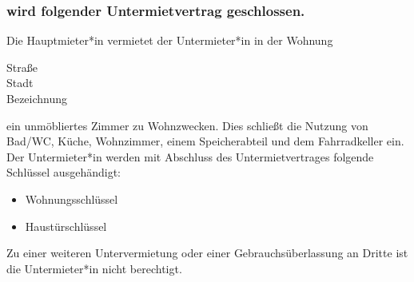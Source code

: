 

\subsubsection*{wird folgender Untermietvertrag geschlossen.}

Die Hauptmieter*in vermietet der Untermieter*in in der Wohnung

\vspace{2ex}
\begin{addmargin}[.25\textwidth]{.25\textwidth}
  Straße \MYdotfill \textbf{\WOHNUNGstreet~\WOHNUNGstreetnumber} \\
  Stadt \MYdotfill \textbf{\WOHNUNGzipcode~\WOHNUNGcity} \\
  Bezeichnung \MYdotfill \textbf{\WOHNUNGinfoA~\WOHNUNGinfoB}
\end{addmargin}
\vspace{2ex}

ein unmöbliertes Zimmer zu Wohnzwecken. Dies schließt die Nutzung von
Bad/WC, Küche, Wohnzimmer, einem Speicherabteil und dem Fahrradkeller
ein. Der Untermieter*in werden mit Abschluss des Untermietvertrages
folgende Schlüssel ausgehändigt:
\begin{itemize}
\item Wohnungsschlüssel
\item Haustürschlüssel
\end{itemize}

Zu einer weiteren Untervermietung oder einer Gebrauchsüberlassung an Dritte
ist die Untermieter*in nicht berechtigt.
